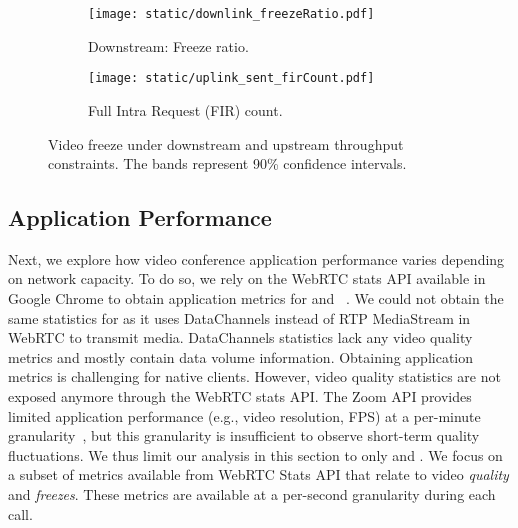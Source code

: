 \begin{figure}[t]
    \centering
    \begin{subfigure}[t]{0.4\textwidth}      
        \texttt{[image: static/downlink\_freezeRatio.pdf]}
        \caption{Downstream: Freeze ratio.}
 		\label{subfig:downlink_freeze_ratio}
    \end{subfigure}
	\begin{subfigure}[t]{0.4\textwidth}   
        \centering
        \texttt{[image: static/uplink\_sent\_firCount.pdf]}
    \caption{Full Intra Request (FIR) count.}
    \label{subfig:uplink_fir}
    \end{subfigure}%
	\caption{Video freeze under downstream and upstream throughput constraints. The bands represent 90\% confidence intervals.%
	}
	\label{fig:video_freeze}
\end{figure}







\subsection{Application Performance}
\label{subsec:application_performance}

Next, we explore how video conference application performance varies depending
on network capacity.  To do so, we rely on the WebRTC stats API
available in Google Chrome to obtain application metrics for \teamsbrowser and
\meet~\cite{webrtc_stats}. We could not obtain the same statistics for
\zoombrowser as it uses DataChannels instead of RTP MediaStream in WebRTC to
transmit media. DataChannels statistics lack any video quality metrics and
mostly contain data volume information. Obtaining application metrics is
challenging for native clients.  However, video quality statistics are not
exposed anymore through the WebRTC stats API. The Zoom API provides limited
application performance (e.g., video resolution, FPS) at a per-minute
granularity~\cite{zoom_qos_api}, but this granularity is insufficient to
observe short-term quality fluctuations.  We thus limit our analysis in this
section to only \meet and \teamsbrowser. We focus on a subset of metrics
available from WebRTC Stats API that relate to video \textit{quality} and
\textit{freezes}. These metrics are available at a per-second granularity
during each call. 

